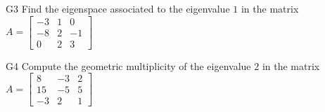 \documentclass{sbgLAexam}
\begin{document}
\begin{problem}{G3}
Find the eigenspace associated to the eigenvalue $1$ in the matrix $A=\begin{bmatrix} -3 & 1 & 0 \\ -8 & 2 & -1 \\ 0 & 2 & 3 \end{bmatrix}$
\end{problem}
\newpage

\begin{problem}{G4}
Compute the geometric multiplicity of the eigenvalue $2$ in the matrix $A=\begin{bmatrix}8 & -3 & 2 \\ 15 & -5 & 5 \\ -3 & 2 & 1\end{bmatrix}$
\end{problem}
\end{document}
